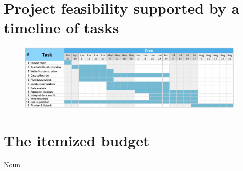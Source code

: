 \documentclass[11pt]{article}
\begin{document}
\section{Project feasibility supported by a timeline of tasks}
\begin{figure}[thpb]
	\centering
	\includegraphics[width = \textwidth]{Gantt.jpg}

\end{figure}
\section{The itemized budget}
Noun
\newpage



\end{document}

